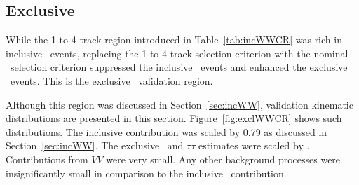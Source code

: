 \subsection{Exclusive \WW}
\label{sec:exclWWCR}
\par While the 1 to 4-track region introduced in Table~\ref{tab:incWWCR} was 
rich in inclusive \WW\ events, replacing the 1 to 4-track selection criterion with the 
nominal \DZ\ selection criterion suppressed the inclusive \WW\ events and enhanced 
the exclusive \WW\ events. This is the exclusive \WW\ validation region. 

\par Although this region was discussed in Section~\ref{sec:incWW}, validation kinematic 
distributions are presented in this section. Figure~\ref{fig:exclWWCR} shows such 
distributions. The inclusive \WW contribution was scaled by 0.79 as discussed in Section~\ref{sec:incWW}. 
The exclusive \WW\ and $\tau\tau$ estimates were scaled by \fgam. Contributions from 
$VV$ were very small. Any other background processes were insignificantly small in comparison to 
the inclusive \WW\ contribution. 
  
